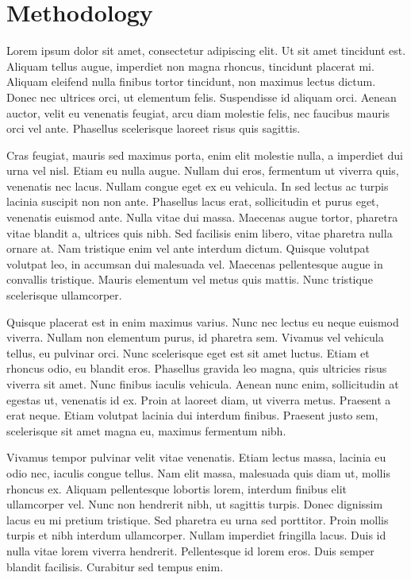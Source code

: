 \documentclass[conference]{IEEEtran}
\begin{document}
\section{Methodology}

Lorem ipsum dolor sit amet, consectetur adipiscing elit. Ut sit amet tincidunt est. Aliquam tellus augue, imperdiet non magna rhoncus, tincidunt placerat mi. Aliquam eleifend nulla finibus tortor tincidunt, non maximus lectus dictum. Donec nec ultrices orci, ut elementum felis. Suspendisse id aliquam orci. Aenean auctor, velit eu venenatis feugiat, arcu diam molestie felis, nec faucibus mauris orci vel ante. Phasellus scelerisque laoreet risus quis sagittis.

Cras feugiat, mauris sed maximus porta, enim elit molestie nulla, a imperdiet dui urna vel nisl. Etiam eu nulla augue. Nullam dui eros, fermentum ut viverra quis, venenatis nec lacus. Nullam congue eget ex eu vehicula. In sed lectus ac turpis lacinia suscipit non non ante. Phasellus lacus erat, sollicitudin et purus eget, venenatis euismod ante. Nulla vitae dui massa. Maecenas augue tortor, pharetra vitae blandit a, ultrices quis nibh. Sed facilisis enim libero, vitae pharetra nulla ornare at. Nam tristique enim vel ante interdum dictum. Quisque volutpat volutpat leo, in accumsan dui malesuada vel. Maecenas pellentesque augue in convallis tristique. Mauris elementum vel metus quis mattis. Nunc tristique scelerisque ullamcorper.

Quisque placerat est in enim maximus varius. Nunc nec lectus eu neque euismod viverra. Nullam non elementum purus, id pharetra sem. Vivamus vel vehicula tellus, eu pulvinar orci. Nunc scelerisque eget est sit amet luctus. Etiam et rhoncus odio, eu blandit eros. Phasellus gravida leo magna, quis ultricies risus viverra sit amet. Nunc finibus iaculis vehicula. Aenean nunc enim, sollicitudin at egestas ut, venenatis id ex. Proin at laoreet diam, ut viverra metus. Praesent a erat neque. Etiam volutpat lacinia dui interdum finibus. Praesent justo sem, scelerisque sit amet magna eu, maximus fermentum nibh.

Vivamus tempor pulvinar velit vitae venenatis. Etiam lectus massa, lacinia eu odio nec, iaculis congue tellus. Nam elit massa, malesuada quis diam ut, mollis rhoncus ex. Aliquam pellentesque lobortis lorem, interdum finibus elit ullamcorper vel. Nunc non hendrerit nibh, ut sagittis turpis. Donec dignissim lacus eu mi pretium tristique. Sed pharetra eu urna sed porttitor. Proin mollis turpis et nibh interdum ullamcorper. Nullam imperdiet fringilla lacus. Duis id nulla vitae lorem viverra hendrerit. Pellentesque id lorem eros. Duis semper blandit facilisis. Curabitur sed tempus enim.
\end{document}
